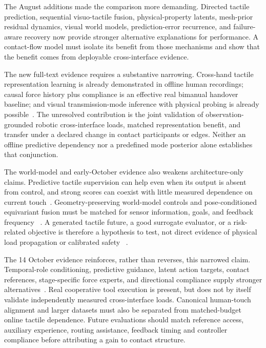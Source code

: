 The August additions made the comparison more demanding. Directed tactile
prediction, sequential visuo-tactile fusion,
physical-property latents, mesh-prior residual dynamics, visual world models,
prediction-error recurrence, and failure-aware recovery now provide stronger
alternative explanations for performance. A contact-flow model must isolate its
benefit from those mechanisms and show that the benefit comes from deployable
cross-interface evidence.

The new full-text evidence requires a substantive narrowing. Cross-hand tactile
representation learning is already demonstrated in offline human recordings;
causal force history plus compliance is an effective real bimanual handover
baseline; and visual transmission-mode inference with physical probing is already
possible~\cite{liang2026biviewtouch,marra2026temporaltactilehandover,hu2026cadet}.
The unresolved contribution is the joint validation of observation-grounded
robotic cross-interface loads, matched representation benefit, and transfer under
a declared change in contact participants or edges. Neither an offline predictive
dependency nor a predefined mode posterior alone establishes that conjunction.

The world-model and early-October evidence also weakens architecture-only claims.
Predictive tactile supervision can help even when its output is absent from
control, and strong scores can coexist with little measured dependence on current
touch~\cite{zhang2026medex,li2026uvta,yang2026simpletouch}. Geometry-preserving
world-model controls and pose-conditioned equivariant fusion must be matched for
sensor information, goals, and feedback frequency
~\cite{zhang2026contactworld,wong2026vista}. A generated tactile future, a good
surrogate evaluator, or a risk-related objective is therefore a hypothesis to
test, not direct evidence of physical load propagation or calibrated safety
~\cite{qin2026dextouchwm,jiang2026rate}.

The 14 October evidence reinforces, rather than reverses, this narrowed claim.
Temporal-role conditioning, predictive guidance, latent action targets, contact
references, stage-specific force experts, and directional compliance supply
stronger alternatives~\cite{chen2026pace,chen2026foretac,zheng2026ila,
nie2026ctp,huang2026deftvla,yuan2026fomodex}. Real cooperative tool execution is
present, but does not by itself validate independently measured cross-interface
loads. Canonical human-touch alignment and larger datasets must also be separated
from matched-budget online tactile dependence. Future evaluations should match
reference access, auxiliary experience, routing assistance, feedback timing and
controller compliance before attributing a gain to contact structure.

